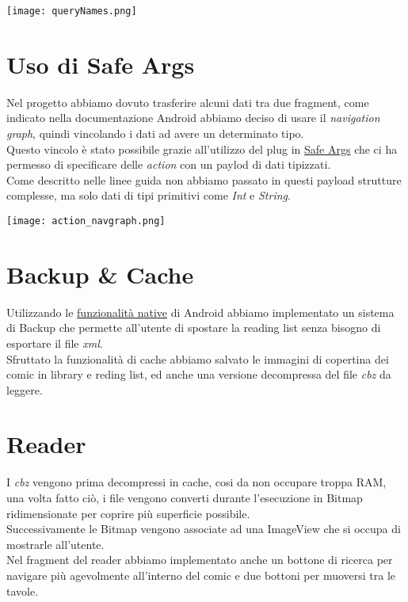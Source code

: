 \documentclass[../Assignment-3-LPSMT.tex]{subfiles}
\begin{document}
\begin{center}
  \texttt{[image: queryNames.png]}
\end{center}

\section{Uso di Safe Args}

Nel progetto abbiamo dovuto trasferire alcuni dati tra due fragment, come indicato nella documentazione Android abbiamo deciso di usare il \emph{navigation graph}, quindi vincolando i dati ad avere un determinato tipo.\\
Questo vincolo è stato possibile grazie all'utilizzo del plug in \href{https://developer.android.com/guide/navigation/use-graph/pass-data#Safe-args}{Safe Args} che ci ha permesso di specificare delle \emph{action} con un paylod di dati tipizzati.\\
Come descritto nelle linee guida non abbiamo passato in questi payload strutture complesse, ma solo dati di tipi primitivi come \emph{Int} e \emph{String}.

\begin{center}
  \texttt{[image: action\_navgraph.png]}
\end{center}

\section{Backup \& Cache}

Utilizzando le \href{https://developer.android.com/guide/topics/data/autobackup}{funzionalità native} di Android abbiamo implementato un sistema di Backup che permette all'utente di spostare la reading list senza bisogno di esportare il file \emph{xml}.\\
Sfruttato la funzionalità di cache abbiamo salvato le immagini di copertina dei comic in library e reding list, ed anche una versione decompressa del file \emph{cbz} da leggere.

\section{Reader}

I \emph{cbz} vengono prima decompressi in cache, cosi da non occupare troppa RAM, una volta fatto ciò, i file vengono converti durante l'esecuzione in Bitmap ridimensionate per coprire più superficie possibile.\\
Successivamente le Bitmap vengono associate ad una ImageView che si occupa di mostrarle all'utente.\\
Nel fragment del reader abbiamo implementato anche un bottone di ricerca per navigare più agevolmente all'interno del comic e due bottoni per muoversi tra le tavole.
\end{document}
